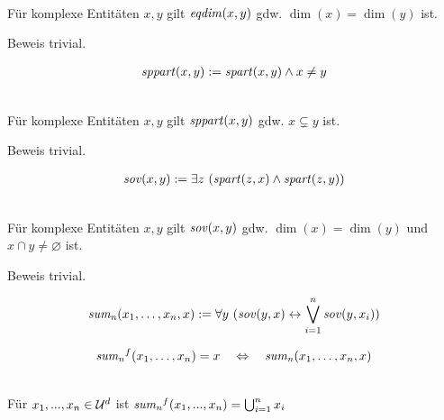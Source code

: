 \begin{satz}\ \\
    Für komplexe Entitäten $x,y$ gilt $\mathit{eqdim}(x,y)$ gdw. $\dim(x) = \dim(y)$ ist.
\end{satz}
Beweis trivial.


\begin{erin}
    \begin{align*}
        \mathit{sppart}(x, y) := \mathit{spart}(x, y) \land  x \neq y
    \end{align*}
\end{erin}

\begin{satz}\ \\
    Für komplexe Entitäten $x,y$ gilt $\mathit{sppart}(x,y)$ gdw. $x \subsetneq y$ ist.
\end{satz}
Beweis trivial.


\begin{erin}
    \begin{align*}
        \mathit{sov}(x, y) := \exists z\  (\mathit{spart}(z, x) \wedge \mathit{spart}(z, y))
    \end{align*}
\end{erin}

\begin{satz}\ \\
    Für komplexe Entitäten $x,y$ gilt $\mathit{sov}(x,y)$ gdw. $\dim(x) = \dim(y)$ und $x \cap y \neq \varnothing$ ist.
\end{satz}
Beweis trivial.


\begin{erin}
    \begin{align*}
        \mathit{sum_{n}}(x_{1},\ldots,x_{n},x) := \forall y\ (\mathit{sov}(y,x) \leftrightarrow \bigvee^{n}_{i=1} \mathit{sov}(y,x_{i}))
    \end{align*}
\end{erin}

\begin{erin}
    \begin{align*}
        \mathit{sum_{n}}^f(x_{1},\ldots,x_{n}) = x \quad \Leftrightarrow \quad \mathit{sum_{n}}(x_{1},\ldots,x_{n},x)
    \end{align*}
\end{erin}

\begin{hyp}\ \\
    Für $x_1, ..., x_n \in \mathcal{U}^d$ ist $\mathit{sum_{n}}^f(x_1, ..., x_n) = \bigcup_{i=1}^n x_i$
\end{hyp}


